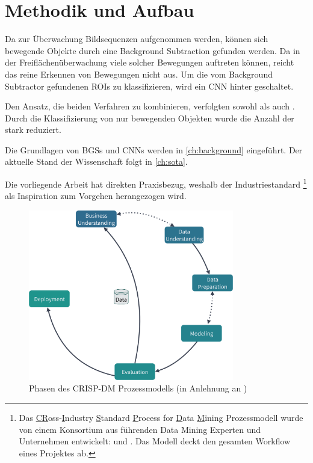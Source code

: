 
\section{Methodik und Aufbau}
Da zur Überwachung Bildsequenzen aufgenommen werden, können sich bewegende Objekte durch eine Background Subtraction gefunden werden.
Da in der Freiflächenüberwachung viele solcher Bewegungen auftreten können, reicht das reine Erkennen von Bewegungen nicht aus.
Um die vom Background Subtractor gefundenen \acp{ROI} zu klassifizieren, wird ein \ac{CNN} hinter geschaltet.

Den Ansatz, die beiden Verfahren zu kombinieren, verfolgten sowohl \citeauthor{kim_hybrid_2018} als auch \citeauthor{yu_combining_2019} \cite{kim_hybrid_2018,yu_combining_2019}.
Durch die Klassifizierung von nur bewegenden Objekten wurde die Anzahl der  stark reduziert.

Die Grundlagen von \acp{BGS} und \acp{CNN} werden in \autoref{ch:background} eingeführt.
Der aktuelle Stand der Wissenschaft folgt in \autoref{ch:sota}.

\bigskip
Die vorliegende Arbeit hat direkten Praxisbezug, weshalb der Industriestandard \footnote{Das {\underline{CR}oss-\underline{I}ndustry \underline{S}tandard \underline{P}rocess for \underline{D}ata \underline{M}ining} Prozessmodell wurde von einem Konsortium aus führenden Data Mining Experten und Unternehmen entwickelt:  und  \cite{wirth_crisp-dm_2000}. Das Modell deckt den gesamten Workflow eines  Projektes ab.} als Inspiration zum Vorgehen herangezogen wird.

\begin{figure}[ht]
    \begin{small}
        \begin{center}
            \includegraphics[width=0.8\textwidth]{figures/crisp_dm}
        \end{center}
        \caption{Phasen des CRISP-DM Prozessmodells (in Anlehnung an \cite{wirth_crisp-dm_2000})}
        \label{ch1:fig:crisp}
    \end{small}
\end{figure}

